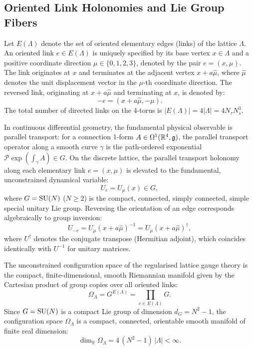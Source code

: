 \subsection{Oriented Link Holonomies and Lie Group Fibers}
\label{subsec:link_holonomies}
Let $E(\Lambda)$ denote the set of oriented elementary edges (links) of the lattice $\Lambda$. An oriented link $e \in E(\Lambda)$ is uniquely specified by its base vertex $x \in \Lambda$ and a positive coordinate direction $\mu \in \{0, 1, 2, 3\}$, denoted by the pair $e = (x, \mu)$. The link originates at $x$ and terminates at the adjacent vertex $x + a\hat{\mu}$, where $\hat{\mu}$ denotes the unit displacement vector in the $\mu$-th coordinate direction. The reversed link, originating at $x + a\hat{\mu}$ and terminating at $x$, is denoted by:
\begin{equation}
-e = (x + a\hat{\mu}, -\mu).
\end{equation}
The total number of directed links on the 4-torus is $|E(\Lambda)| = 4 |\Lambda| = 4 N_\tau N_s^3$.

In continuous differential geometry, the fundamental physical observable is parallel transport: for a connection 1-form $A \in \Omega^1(\mathbb{R}^4, \mathfrak{g})$, the parallel transport operator along a smooth curve $\gamma$ is the path-ordered exponential $\mathcal{P} \exp(\int_\gamma A) \in G$. On the discrete lattice, the parallel transport holonomy along each elementary link $e = (x, \mu)$ is elevated to the fundamental, unconstrained dynamical variable:
\begin{equation}
U_e = U_\mu(x) \in G,
\end{equation}
where $G = \mathrm{SU}(N)$ ($N \ge 2$) is the compact, connected, simply connected, simple special unitary Lie group. Reversing the orientation of an edge corresponds algebraically to group inversion:
\begin{equation}
U_{-e} = U_\mu(x + a\hat{\mu})^{-1} = U_\mu(x + a\hat{\mu})^\dagger,
\end{equation}
where $U^\dagger$ denotes the conjugate transpose (Hermitian adjoint), which coincides identically with $U^{-1}$ for unitary matrices.

The unconstrained configuration space of the regularised lattice gauge theory is the compact, finite-dimensional, smooth Riemannian manifold given by the Cartesian product of group copies over all oriented links:
\begin{equation}
\label{eq:config_space_def}
\Omega_\Lambda = G^{E(\Lambda)} = \prod_{e \in E(\Lambda)} G.
\end{equation}
Since $G = \mathrm{SU}(N)$ is a compact Lie group of dimension $d_G = N^2 - 1$, the configuration space $\Omega_\Lambda$ is a compact, connected, orientable smooth manifold of finite real dimension:
\begin{equation}
\dim_{\mathbb{R}} \Omega_\Lambda = 4 \, (N^2 - 1) \, |\Lambda| < \infty.
\end{equation}

